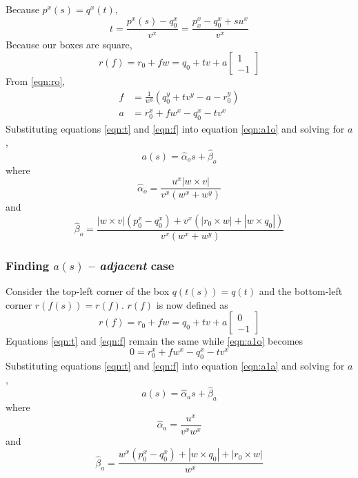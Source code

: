\documentclass{egpubl}
\begin{document}
Because $p^x(s)=q^x(t)$,
\begin{equation}
t = \frac{p^x(s)-q_0^x}{v^x} = \frac{p_x^x-q_0^x+su^x}{v^x} \label{eqn:t}
\end{equation}
Because our boxes are square,
\begin{equation}
r(f) = r_0+fw = q_0+tv+a\begin{bmatrix}1\\-1\end{bmatrix} \label{eqn:ro}
\end{equation}
From \eqref{eqn:ro},
\begin{align}
f &= \frac{1}{w^y}(q_0^y+tv^y-a-r_0^y) \label{eqn:f} \\
a &= r_0^x+fw^x-q_0^x-tv^x \label{eqn:a1o}
\end{align}
Substituting equations \eqref{eqn:t} and \eqref{eqn:f} into equation \eqref{eqn:a1o} and solving for $a$,
\begin{equation}
a(s) = \hat{\alpha}_o s + \hat{\beta}_o \label{eqn:ao}
\end{equation}
where
\begin{equation}
\hat{\alpha}_o = \frac{u^x|w \times v|}{v^x(w^x+w^y)}
\end{equation}
and
\begin{equation}
\hat{\beta}_o = \frac{|w \times v|(p_0^x-q_0^x) + v^x(|r_0 \times w| + |w \times q_0|)}{v^x(w^x+w^y)}
\end{equation}

\subsubsection{Finding $a(s)$ -- \textit{adjacent} case}

Consider the top-left corner of the box $q(t(s))=q(t)$ and the bottom-left corner $r(f(s))=r(f)$. $r(f)$ is now defined as
\begin{equation}
r(f) = r_0+fw = q_0+tv+a\begin{bmatrix}0\\-1\end{bmatrix} \label{eqn:ra}
\end{equation}
Equations \eqref{eqn:t} and \eqref{eqn:f} remain the same while \eqref{eqn:a1o} becomes
\begin{equation}
0 = r_0^x+fw^x-q_0^x-tv^x \label{eqn:a1a}
\end{equation}
Substituting equations \eqref{eqn:t} and \eqref{eqn:f} into equation \eqref{eqn:a1a} and solving for $a$,
\begin{equation}
a(s) = \hat{\alpha}_a s + \hat{\beta}_a \label{eqn:aa}
\end{equation}
where
\begin{equation}
\hat{\alpha}_a = \frac{u^x}{v^xw^x}
\end{equation}
and
\begin{equation}
\hat{\beta}_a = \frac{w^x(p_0^x-q_0^x)+|w \times q_0| + |r_0 \times w|}{w^x}
\end{equation}
\end{document}
